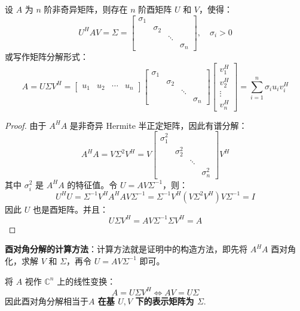 \begin{theorem}[非奇异方阵的酉对角分解]
设 $A$ 为 $n$ 阶非奇异矩阵，则存在 $n$ 阶酉矩阵 $U$ 和 $V$，使得：
\[
    U^HAV=\Sigma=\begin{bmatrix}\sigma_1&&&\\&\sigma_2&&\\&&\ddots&\\&&&\sigma_n\end{bmatrix},\quad\sigma_i>0
\]
或写作矩阵分解形式：
\[
    A=U\Sigma V^H=
    \begin{bmatrix}
    u_1&u_2&\cdots&u_n
    \end{bmatrix}
    \begin{bmatrix}
    \sigma_1&&&\\
    &\sigma_2&&\\
    &&\ddots&\\
    &&&\sigma_n
    \end{bmatrix}
    \begin{bmatrix}
    v_1^H\\v_2^H\\\vdots\\v_n^H
    \end{bmatrix}=\sum_{i=1}^n\sigma_iu_iv_i^H
\]
\end{theorem}
\begin{proof}
由于 $A^HA$ 是非奇异 Hermite 半正定矩阵，因此有谱分解：
\[
    A^HA=V\Sigma^2V^H=V\begin{bmatrix}\sigma_1^2&&&\\&\sigma_2^2&&\\&&\ddots&\\&&&\sigma_n^2\end{bmatrix}V^H
\]
其中 $\sigma_i^2$ 是 $A^HA$ 的特征值。令 $U=AV\Sigma^{-1}$，则：
\[
    U^HU=\Sigma^{-1}V^HA^HAV\Sigma^{-1}=\Sigma^{-1}V^H(V\Sigma^2V^H)V\Sigma^{-1}=I
\]
因此 $U$ 也是酉矩阵。并且：
\[
    U\Sigma V^H=AV\Sigma^{-1}\Sigma V^{H}=A
\]
\end{proof}

\noindent\textbf{酉对角分解的计算方法}：计算方法就是证明中的构造方法，即先将 $A^HA$ 酉对角化，求解 $V$ 和 $\Sigma$，再令 $U=AV\Sigma^{-1}$ 即可。

\begin{remark}
将 $A$ 视作 $\mathbb C^n$ 上的线性变换：
\[
    A=U\Sigma V^H\iff AV=U\Sigma
\]
因此酉对角分解相当于\textbf{$A$ 在基 $U,V$ 下的表示矩阵为 $\Sigma$}.
\end{remark}

